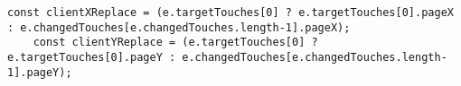 \begin{lstlisting}[caption=e.clientX und e.clientY Ersetzung]
	const clientXReplace = (e.targetTouches[0] ? e.targetTouches[0].pageX : e.changedTouches[e.changedTouches.length-1].pageX);
	const clientYReplace = (e.targetTouches[0] ? e.targetTouches[0].pageY : e.changedTouches[e.changedTouches.length-1].pageY);
\end{lstlisting} 




